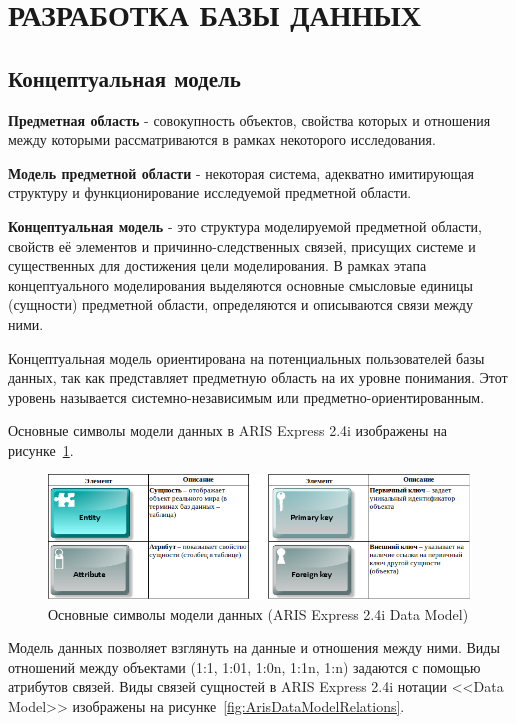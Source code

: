\section{РАЗРАБОТКА БАЗЫ ДАННЫХ}
\subsection{Концептуальная модель}

\textbf{Предметная область} - совокупность объектов,
свойства которых и отношения между которыми рассматриваются в рамках некоторого исследования.

\textbf{Модель предметной области} - некоторая система, адекватно имитирующая
структуру и функционирование исследуемой предметной области.

\textbf{Концептуальная модель} - это структура моделируемой предметной области,
свойств её элементов и причинно-следственных связей, присущих системе и
существенных для достижения цели моделирования.
В рамках этапа концептуального моделирования выделяются основные смысловые единицы (сущности)
предметной области, определяются и описываются связи между ними.

Концептуальная модель ориентирована на потенциальных пользователей базы данных,
так как представляет предметную область на их уровне понимания.
Этот уровень называется системно-независимым или предметно-ориентированным.

Основные символы модели данных в ARIS Express 2.4i \cite{ArisExpress} 
изображены на рисунке~\ref{fig:ArisDataModel}.

\begin{figure}[!h]
    \centering

    \includegraphics[width=18cm]
    {assets/ARIS/DataModel/Elements/ArisDataModel.png}

    \caption{Основные символы модели данных (ARIS Express 2.4i Data Model)}

    \label{fig:ArisDataModel}
\end{figure}

Модель данных позволяет взглянуть на данные и отношения между ними.
Виды отношений между объектами (1:1, 1:01, 1:0n, 1:1n, 1:n) задаются с помощью атрибутов связей.
Виды связей сущностей в ARIS Express 2.4i \cite{ArisExpress} нотации <<Data Model>> изображены на рисунке~\ref{fig:ArisDataModelRelations}.

